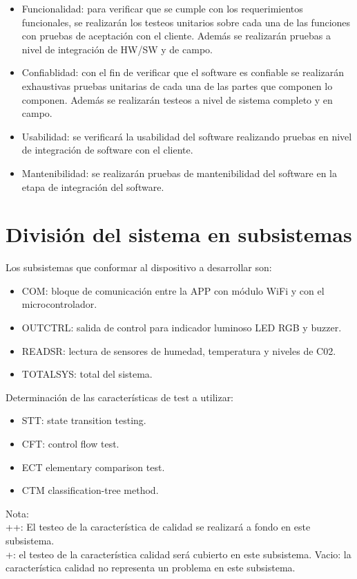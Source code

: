 \documentclass[
11pt, %
]{charter}
\begin{document}
\begin{itemize}
\item Funcionalidad: para verificar que se cumple con los requerimientos funcionales, se realizarán los testeos unitarios sobre cada una de las funciones con pruebas de aceptación con el cliente. Además se realizarán pruebas a nivel de integración de HW/SW y de campo.
\item Confiablidad: con el fin de verificar que el software es confiable se realizarán exhaustivas pruebas unitarias de cada una de las partes que componen lo componen. Además se realizarán testeos a nivel de sistema completo y en campo.
\item Usabilidad: se verificará la usabilidad del software realizando pruebas en nivel de integración de software con el cliente.
\item Mantenibilidad: se realizarán pruebas de mantenibilidad del software en la etapa de integración del software.
\end{itemize}

\section{División del sistema en subsistemas}

Los subsistemas que conformar al dispositivo a desarrollar son:
\begin{itemize}
\item COM: bloque de comunicación entre la APP con módulo WiFi y con el microcontrolador.
\item OUTCTRL: salida de control para indicador luminoso LED RGB y buzzer.
\item READSR: lectura de sensores de humedad, temperatura y niveles de C02.
\item TOTALSYS: total del sistema.
\end{itemize}


Determinación de las características de test a utilizar:
\begin{itemize}
\item STT: state transition testing.
\item CFT: control flow test.
\item ECT elementary comparison test.
\item CTM classification-tree method.
\end{itemize}

Nota:\\
++: El testeo de la característica de calidad se realizará a fondo en este subsistema.\\
+: el testeo de la característica calidad será cubierto en este subsistema.
Vacio: la característica calidad no representa un problema en este subsistema. \\
\end{document}
